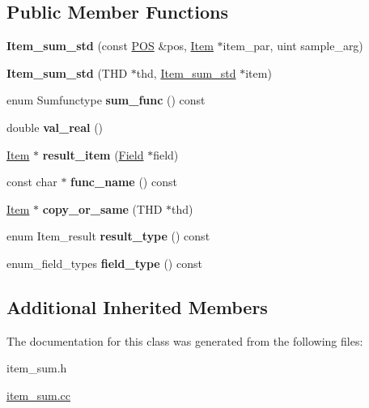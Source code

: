 \subsection*{Public Member Functions}
\begin{DoxyCompactItemize}
\item 
\mbox{\label{classItem__sum__std_a2ddc6769cbaa026a35dd34a17a46ed24}} 
{\bfseries Item\+\_\+sum\+\_\+std} (const \mbox{\hyperlink{structYYLTYPE}{P\+OS}} \&pos, \mbox{\hyperlink{classItem}{Item}} $\ast$item\+\_\+par, uint sample\+\_\+arg)
\item 
\mbox{\label{classItem__sum__std_a7cb91181cf60db2d084ef0c519c9d445}} 
{\bfseries Item\+\_\+sum\+\_\+std} (T\+HD $\ast$thd, \mbox{\hyperlink{classItem__sum__std}{Item\+\_\+sum\+\_\+std}} $\ast$item)
\item 
\mbox{\label{classItem__sum__std_af18690ae9363a7b90be0a1702d2cc8d2}} 
enum Sumfunctype {\bfseries sum\+\_\+func} () const
\item 
\mbox{\label{classItem__sum__std_aca69844d4556961dc36984aa39115242}} 
double {\bfseries val\+\_\+real} ()
\item 
\mbox{\label{classItem__sum__std_a69de063197af1b385cebe72e18cca024}} 
\mbox{\hyperlink{classItem}{Item}} $\ast$ {\bfseries result\+\_\+item} (\mbox{\hyperlink{classField}{Field}} $\ast$field)
\item 
\mbox{\label{classItem__sum__std_a55125a4f401d874c0e772df88ca6419e}} 
const char $\ast$ {\bfseries func\+\_\+name} () const
\item 
\mbox{\label{classItem__sum__std_ac761f72ef575fac2e97cc066a3a01e9c}} 
\mbox{\hyperlink{classItem}{Item}} $\ast$ {\bfseries copy\+\_\+or\+\_\+same} (T\+HD $\ast$thd)
\item 
\mbox{\label{classItem__sum__std_a1c083e8c2b1a478149d9715f7b3543e8}} 
enum Item\+\_\+result {\bfseries result\+\_\+type} () const
\item 
\mbox{\label{classItem__sum__std_aab76aff8ee0e0091ac19ceda6d4d870a}} 
enum\+\_\+field\+\_\+types {\bfseries field\+\_\+type} () const
\end{DoxyCompactItemize}
\subsection*{Additional Inherited Members}


The documentation for this class was generated from the following files\+:\begin{DoxyCompactItemize}
\item 
item\+\_\+sum.\+h\item 
\mbox{\hyperlink{item__sum_8cc}{item\+\_\+sum.\+cc}}\end{DoxyCompactItemize}
